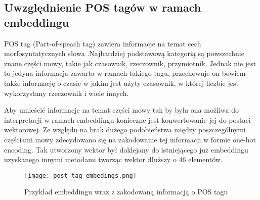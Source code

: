 

\subsection{Uwzględnienie POS tagów w ramach embeddingu}


POS tag (Part-of-speach tag) zawiera informacje na temat cech morfosyntatycznych słowa \cite{postags_def}.Najbardziej podstawową kategorią są powszechnie znane części mowy, takie jak czasownik, rzeczownik, przymiotnik. Jednak nie jest to jedyna informacja zawarta w ramach takiego tagu, przechowuje on bowiem także informację o czasie w jakim jest użyty czasownik, w której liczbie jest wykorzystany rzeczownik i wiele innych.




Aby umieścić informacje na temat części mowy tak by była ona możliwa do interpretacji w ramach embeddingu konieczne jest konwertowanie jej do postaci wektorowej. Ze względu na brak dużego podobieństwa między poszczególnymi częściami mowy zdecydowano się na zakodowanie tej informacji w formie one-hot encoding. Tak utworzony wektor był doklejany do istniejącego już embeddingu uzyskanego innymi metodami tworząc wektor dłuższy o 46 elementów.




\begin{figure}[!h]
    \label{fig:post_tag}
    \centering \texttt{[image: post\_tag\_embedings.png]}
    \caption{Przykład embeddingu wraz z zakodowaną informacją o POS tagu}
\end{figure}